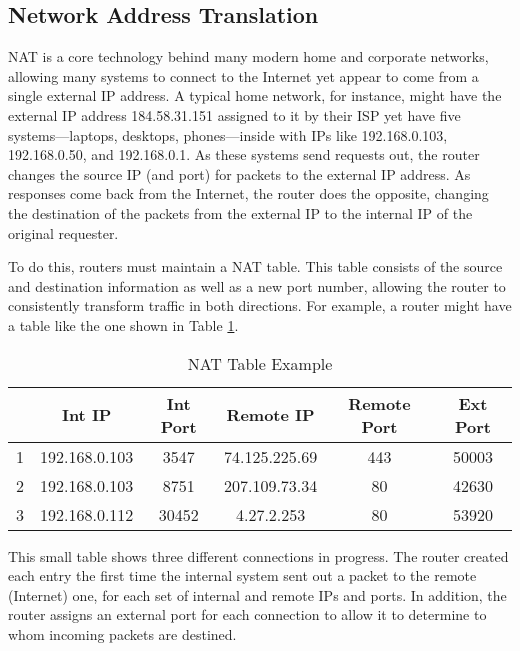 \subsection{Network Address Translation}
\label{sec:nat}
\par \ac{NAT} is a core technology behind many modern home and corporate networks, allowing many systems to connect to the Internet yet appear to come from a single external \ac{IP} address. A typical home network, for instance, might have the external IP address 184.58.31.151 assigned to it by their \ac{ISP} yet have five systems---laptops, desktops, phones---inside with \acp{IP} like 192.168.0.103, 192.168.0.50, and 192.168.0.1. As these systems send requests out, the router changes the source IP (and port) for packets to the external IP address. As responses come back from the Internet, the router does the opposite, changing the destination of the packets from the external IP to the internal IP of the original requester.

\par To do this, routers must maintain a \ac{NAT} table. This table consists of the source and destination information as well as a new port number, allowing the router to consistently transform traffic in both directions. For example, a router might have a table like the one shown in Table \ref{tab:nat_example}.

\begin{table}
\caption{\ac{NAT} Table Example}
\label{tab:nat_example}
\centering
\begin{tabular}{r|ccccc}
  & \textbf{Int IP}  & \textbf{Int Port}  & \textbf{Remote IP}  & \textbf{Remote Port}  & \textbf{Ext Port} \\
\hline
1 & 192.168.0.103 & 3547 & 74.125.225.69 & 443 & 50003\\
2 & 192.168.0.103 & 8751 & 207.109.73.34 & 80 & 42630\\
3 & 192.168.0.112 & 30452 & 4.27.2.253 & 80 & 53920
\end{tabular}
\end{table}

\par This small table shows three different connections in progress. The router created each entry the first time the internal system sent out a packet to the remote (Internet) one, for each set of internal and remote \acp{IP} and ports. In addition, the router assigns an external port for each connection to allow it to determine to whom incoming packets are destined.

